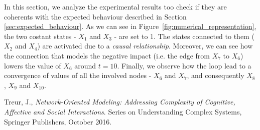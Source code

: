 \documentclass[a4paper]{article}
\begin{document}
In this section, we analyze the experimental results too check if they are coherents with the expected behaviour described in Section \ref{sec:expected_behaviour}. As we can see in Figure~\ref{fig:numerical_representation}, the two costant states - $X_{1}$ and $X_{3}$ - are set to 1. The states connected to them ($X_{2}$ and $X_{4}$) are activated due to a \textit{causal relationship}. Moreover, we can see how the connection that models the negative impact (i.e. the edge from $X_{7}$ to $X_{6}$) lowers the value of $X_{6}$ around $t = 10$. Finally, we observe how the loop lead to a convergence of values of all the involved nodes - $X_{6}$ and $X_{7}$, and consequently $X_{8}$, $X_{9}$ and $X_{10}$.





\begin{thebibliography}{9}
  Treur, J.,
  \emph{Network-Oriented Modeling: Addressing Complexity of Cognitive, Affective and Social Interactions}.
  Series on Understanding Complex Systems, Springer Publishers, October 2016.

\end{thebibliography}
\end{document}
